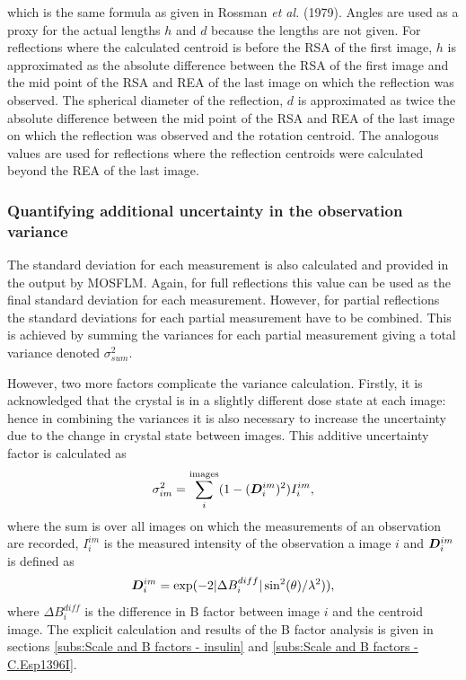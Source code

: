 which is the same formula as given in Rossman \textit{et al.} (1979). \nocite{rossmann1979processing}
Angles are used as a proxy for the actual lengths $h$ and $d$ because the lengths are not given.
For reflections where the calculated centroid is before the RSA of the first image, $h$ is approximated as the absolute difference between the RSA of the first image and the mid point of the RSA and REA of the last image on which the reflection was observed.
The spherical diameter of the reflection, $d$ is approximated as twice the absolute difference between the mid point of the RSA and REA of the last image on which the reflection was observed and the rotation centroid.
The analogous values are used for reflections where the reflection centroids were calculated beyond the REA of the last image.

\subsubsection{Quantifying additional uncertainty in the observation variance}
\label{subs:Quantifying additional uncertainty in the observation variance}
The standard deviation for each measurement is also calculated and provided in the output by MOSFLM.
Again, for full reflections this value can be used as the final standard deviation for each measurement.
However, for partial reflections the standard deviations for each partial measurement have to be combined.
This is achieved by summing the variances for each partial measurement giving a total variance denoted $\sigma^2_{sum}$.

However, two more factors complicate the variance calculation.
Firstly, it is acknowledged that the crystal is in a slightly different dose state at each image: hence in combining the variances it is also necessary to increase the uncertainty due to the change in crystal state between images.
This additive uncertainty factor is calculated as
\begin{equation}
    \sigma_{im}^2 = \sum_i^{\text{images}} (1 - (\boldsymbol{D}^{im}_i)^2) I^{im}_i,
\end{equation}
where the sum is over all images on which the measurements of an observation are recorded, $I^{im}_i$ is the measured intensity of the observation a image $i$ and $\boldsymbol{D}^{im}_i$ is defined as
\begin{equation}
    \boldsymbol{D}^{im}_i = \exp(-2 |\Delta B_{i}^{diff}|\sin^2(\theta) / \lambda^2)),
\end{equation}
where $\Delta B_{i}^{diff}$ is the difference in B factor between image $i$ and the centroid image.
The explicit calculation and results of the B factor analysis is given in sections \ref{subs:Scale and B factors - insulin} and \ref{subs:Scale and B factors - C.Esp1396I}.


